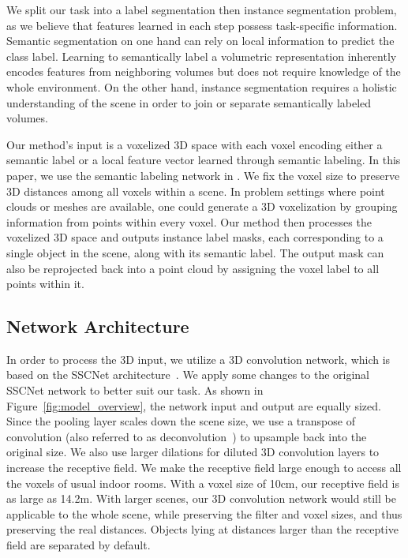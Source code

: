 \documentclass[10pt,twocolumn,letterpaper]{article}
\newcommand{\boldparagraph}[1]{\vspace{0.5em}\noindent{\bf #1} }
\begin{document}
We split our task into a label segmentation then instance segmentation problem, as we believe that features learned in each step possess task-specific information. 
Semantic segmentation on one hand can rely on local information to predict the class label.
Learning to semantically label a volumetric representation inherently encodes features from neighboring volumes but does not require knowledge of the whole environment.
On the other hand, instance segmentation requires a holistic understanding of the scene in order to join or separate semantically labeled volumes.












\boldparagraph{Problem Setting.}
Our method's input is a voxelized 3D space with each voxel encoding either a semantic label or a local feature vector learned through semantic labeling. 
In this paper, we use the semantic labeling network in \cite{3DSemanticSegmentationWithSubmanifoldSparseConvNet}.
We fix the voxel size to preserve 3D distances among all voxels within a scene.
In problem settings where point clouds or meshes are available, one could generate a 3D voxelization by grouping information from points within every voxel.
Our method then processes the voxelized 3D space and outputs instance label masks, each corresponding to a single object in the scene, along with its semantic label.
The output mask can also be reprojected back into a point cloud by assigning the voxel label to all points within it. 









\subsection{Network Architecture} \label{subsec:network}
In order to process the 3D input, we utilize a 3D convolution network, which is based on the SSCNet architecture~\cite{Song-et-al-CVPR-2017}.
We apply some changes to the original SSCNet network to better suit our task.
As shown in Figure~\ref{fig:model_overview}, the network input and output are equally sized.
Since the pooling layer scales down the scene size, we use a transpose of convolution (also referred to as deconvolution~\cite{zeiler2010deconvolutional}) to upsample back into the original size. 
We also use larger dilations for diluted 3D convolution layers to increase the receptive field. 
We make the receptive field large enough to access all the voxels of usual indoor rooms. With a voxel size of 10cm, our receptive field is as large as 14.2m. 
With larger scenes, our 3D convolution network would still be applicable to the whole scene, while preserving the filter and voxel sizes, and thus preserving the real distances.
Objects lying at distances larger than the receptive field are separated by default. 
\end{document}
